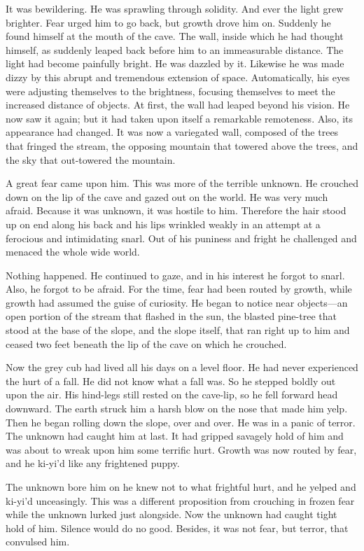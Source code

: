 \documentclass[10pt]{book}
\begin{document}
It was bewildering. He was sprawling through solidity. And ever the
light grew brighter. Fear urged him to go back, but growth drove him
on. Suddenly he found himself at the mouth of the cave. The wall,
inside which he had thought himself, as suddenly leaped back before him
to an immeasurable distance. The light had become painfully bright. He
was dazzled by it. Likewise he was made dizzy by this abrupt and
tremendous extension of space. Automatically, his eyes were adjusting
themselves to the brightness, focusing themselves to meet the increased
distance of objects. At first, the wall had leaped beyond his vision.
He now saw it again; but it had taken upon itself a remarkable
remoteness. Also, its appearance had changed. It was now a variegated
wall, composed of the trees that fringed the stream, the opposing
mountain that towered above the trees, and the sky that out-towered the
mountain.

A great fear came upon him. This was more of the terrible unknown. He
crouched down on the lip of the cave and gazed out on the world. He was
very much afraid. Because it was unknown, it was hostile to him.
Therefore the hair stood up on end along his back and his lips wrinkled
weakly in an attempt at a ferocious and intimidating snarl. Out of his
puniness and fright he challenged and menaced the whole wide world.

Nothing happened. He continued to gaze, and in his interest he forgot
to snarl. Also, he forgot to be afraid. For the time, fear had been
routed by growth, while growth had assumed the guise of curiosity. He
began to notice near objects—an open portion of the stream that flashed
in the sun, the blasted pine-tree that stood at the base of the slope,
and the slope itself, that ran right up to him and ceased two feet
beneath the lip of the cave on which he crouched.

Now the grey cub had lived all his days on a level floor. He had never
experienced the hurt of a fall. He did not know what a fall was. So he
stepped boldly out upon the air. His hind-legs still rested on the
cave-lip, so he fell forward head downward. The earth struck him a
harsh blow on the nose that made him yelp. Then he began rolling down
the slope, over and over. He was in a panic of terror. The unknown had
caught him at last. It had gripped savagely hold of him and was about
to wreak upon him some terrific hurt. Growth was now routed by fear,
and he ki-yi’d like any frightened puppy.

The unknown bore him on he knew not to what frightful hurt, and he
yelped and ki-yi’d unceasingly. This was a different proposition from
crouching in frozen fear while the unknown lurked just alongside. Now
the unknown had caught tight hold of him. Silence would do no good.
Besides, it was not fear, but terror, that convulsed him.
\end{document}
